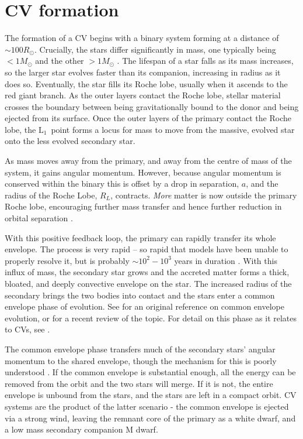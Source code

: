 \section{CV formation}
\label{sect:introduction:formation of CVs}

The formation of a CV begins with a binary system forming at a distance of $\sim 100{R_\odot}$. Crucially, the stars differ significantly in mass, one typically being $<1{M_\odot}$ and the other $>1{M_\odot}$ \citep{Ritter2012}. The lifespan of a star falls as its mass increases, so the larger star evolves faster than its companion, increasing in radius as it does so. Eventually, the star fills its Roche lobe, usually when it ascends to the red giant branch. 
As the outer layers contact the Roche lobe, stellar material crosses the boundary between being gravitationally bound to the donor and being ejected from its surface. 
Once the outer layers of the primary contact the Roche lobe, the $\mathrm L_1$\ point forms a locus for mass to move from the massive, evolved star onto the less evolved secondary star.

As mass moves away from the primary, and away from the centre of mass of the system, it gains angular momentum. However, because angular momentum is conserved within the binary this is offset by a drop in separation, $a$, and the radius of the Roche Lobe, ${R_L}$, contracts. \textit{More} matter is now outside the primary Roche lobe, encouraging further mass transfer and hence further reduction in orbital separation \citep{Ritter2008}.

With this positive feedback loop, the primary can rapidly transfer its whole envelope. The process is very rapid -- so rapid that models have been unable to properly resolve it, but is probably $\sim 10^2 - 10^3$ years in duration \citep{Ritter2012}. With this influx of mass, the secondary star grows and the accreted matter forms a thick, bloated, and deeply convective envelope on the star. The increased radius of the secondary brings the two bodies into contact \citep{Ritter2008} and the stars enter a common envelope phase of evolution. See \citet{paczynski1976} for an original reference on common envelope evolution, or \citet{ivanova2020} for a recent review of the topic. For detail on this phase as it relates to CVs, see \citet{taam1978, webbink1984, zorotovic2010, passy2011}.

The common envelope phase transfers much of the secondary stars' angular momentum to the shared envelope, though the mechanism for this is poorly understood \citep{demarco2011}. 
If the common envelope is substantial enough, all the energy can be removed from the orbit and the two stars will merge. 
If it is not, the entire envelope is unbound from the stars, and the stars are left in a compact orbit. 
CV systems are the product of the latter scenario - the common envelope is ejected via a strong wind, leaving the remnant core of the primary as a white dwarf, and a low mass secondary companion M dwarf. 


